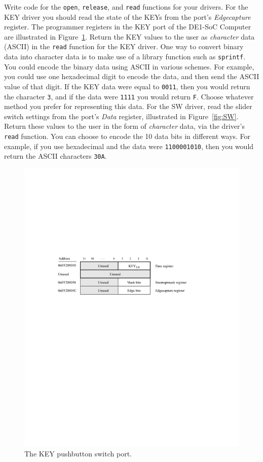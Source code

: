 \documentclass[epsfig,10pt,fullpage]{article}
\begin{document}
\begin{enumerate}
\noindent
Write code for the \texttt{open}, \texttt{release}, and \texttt{read} functions for your drivers.
For the KEY driver you should read the state of the KEYs from the port's {\it Edgecapture} register.
The programmer registers in the KEY port of the DE1-SoC Computer are illustrated in
Figure~\ref{fig:KEY}. Return the KEY values to the user as {\it character} data (ASCII) in 
the \texttt{read} function for the KEY driver. One way to convert binary data into character 
data is to make use of a library function such as \texttt{sprintf}. You could encode the
binary data using ASCII in various schemes. For example, you could use one hexadecimal digit
to encode the data, and then send the ASCII value of that digit. If the KEY data were equal 
to \texttt{0011}, then you would return the character \texttt{3}, and if the data 
were \texttt{1111} you would return \texttt{F}. Choose whatever method you prefer for 
representing this data. For the SW driver, read the slider switch settings from the 
port's {\it Data} register, illustrated in Figure~\ref{fig:SW}. Return these values to the 
user in the form of {\it character} data, via the driver's \texttt{read} function. You can
choose to encode the 10 data bits in different ways. For example, if you use hexadecimal
and the data were \texttt{1100001010}, then you would return the ASCII characters
\texttt{30A}.

\begin{figure}[H]
   \begin{center}
       \includegraphics{figures/figureKEY.pdf}
   \end{center}
    \caption{The KEY pushbutton switch port.}
\label{fig:KEY}
\end{figure}


\end{enumerate}
\end{document}
